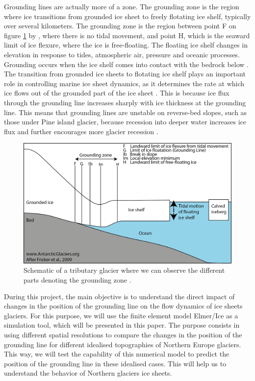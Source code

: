 \documentclass[a4paper,12pt]{article}
\begin{document}
Grounding lines are actually more of a zone. The grounding zone is the region where ice transitions from grounded ice sheet to freely flotating ice shelf, typically over several kilometers. The grounding zone is the region between point F on figure \ref{groundingzone} by \cite{fricker2009mapping}, where there is no tidal movement, and point H, which is the seaward limit of ice flexure, where the ice is free-floating. The floating ice shelf changes in elevation in response to tides, atmospheric air, pressure and oceanic processes. Grounding occurs when the ice shelf comes into contact with the bedrock below \cite[]{fricker2009mapping}. The transition from grounded ice sheets to flotating ice shelf plays an important role in controlling marine ice sheet dynamics, as it determines the rate at which ice flows out of the grounded part of the ice sheet \cite[]{schoof2007ice}. This is because ice flux through the grounding line increases sharply with ice thickness at the grounding line. This means that grounding lines are unstable on reverse-bed slopes, such as those under Pine island glacier, because recession into deeper water increases ice flux and further encourages more glacier recession \cite[]{schoof2007marine}.

\begin{figure}[!h]
	\centering
	\includegraphics[width=0.7\linewidth]{../fig/groundingzone}
	\caption{Schematic of a tributary glacier where we can observe the different parts denoting the grounding zone \cite[]{fricker2009mapping}.}
	\label{groundingzone}
\end{figure}

During this project, the main objective is to understand the direct impact of changes in the position of the grounding line on the flow dynamics of ice sheets glaciers. For this purpose, we will use the finite element model Elmer/Ice as a simulation tool, which will be presented in this paper. The purpose consists in using different spatial resolutions to compare the changes in the position of the grounding line for different idealised topographies of Northern Europe glaciers. This way, we will test the capability of this numerical model to predict the position of the grounding line in these idealised cases. This will help us to understand the behavior of Northern glaciers ice sheets. 
\end{document}
